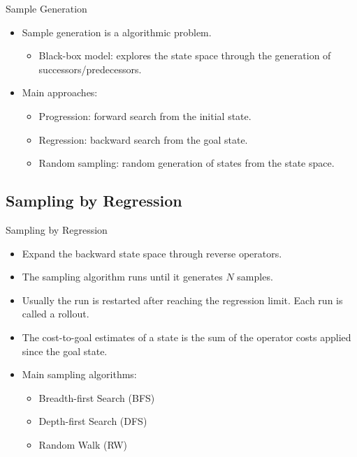 \documentclass{gkibeamer}
\begin{document}
\begin{frame}{Sample Generation}
\begin{itemize}
    \item Sample generation is a algorithmic problem.
    \begin{itemize}
        \item Black-box model: explores the state space through the generation of successors/predecessors.
    \end{itemize}
    \pause
    \item Main approaches:
    \begin{itemize}
        \item Progression: forward search from the initial state.
        \pause
        \item Regression: backward search from the goal state.
        \pause
        \item Random sampling: random generation of states from the state space.
    \end{itemize}
\end{itemize}
\end{frame}

\subsection{Sampling by Regression}

\begin{frame}{Sampling by Regression}
\begin{itemize}
    \item Expand the backward state space through reverse operators.
    \pause
    \item The sampling algorithm runs until it generates $N$ samples.
    \pause
    \item Usually the run is restarted after reaching the \alert{regression limit}. Each run is called a \alert{rollout}.
    \pause
    \item The cost-to-goal estimates of a state is the sum of the operator costs applied since the goal state.
    \pause
    \item Main sampling algorithms:
    \begin{itemize}
        \item Breadth-first Search (BFS)
        \item Depth-first Search (DFS)
        \item Random Walk (RW)
    \end{itemize}
\end{itemize}
\end{frame}
\end{document}
